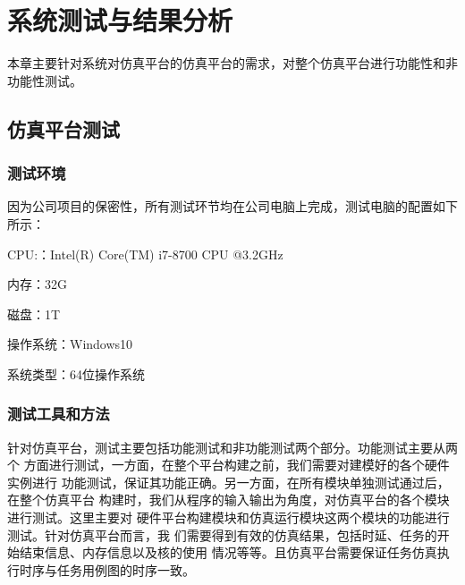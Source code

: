
\chapter{系统测试与结果分析}

本章主要针对系统对仿真平台的仿真平台的需求，对整个仿真平台进行功能性和非功能性测试。
\section{仿真平台测试}

\subsection{测试环境}

因为公司项目的保密性，所有测试环节均在公司电脑上完成，测试电脑的配置如下所示：

CPU:：Intel(R) Core(TM) i7-8700 CPU @3.2GHz

内存：32G

磁盘：1T

操作系统：Windows10

系统类型：64位操作系统

\subsection{测试工具和方法}

针对仿真平台，测试主要包括功能测试和非功能测试两个部分。功能测试主要从两个
方面进行测试，一方面，在整个平台构建之前，我们需要对建模好的各个硬件实例进行
功能测试，保证其功能正确。另一方面，在所有模块单独测试通过后，在整个仿真平台
构建时，我们从程序的输入输出为角度，对仿真平台的各个模块进行测试。这里主要对
硬件平台构建模块和仿真运行模块这两个模块的功能进行测试。针对仿真平台而言，我
们需要得到有效的仿真结果，包括时延、任务的开始结束信息、内存信息以及核的使用
情况等等。且仿真平台需要保证任务仿真执行时序与任务用例图的时序一致。

